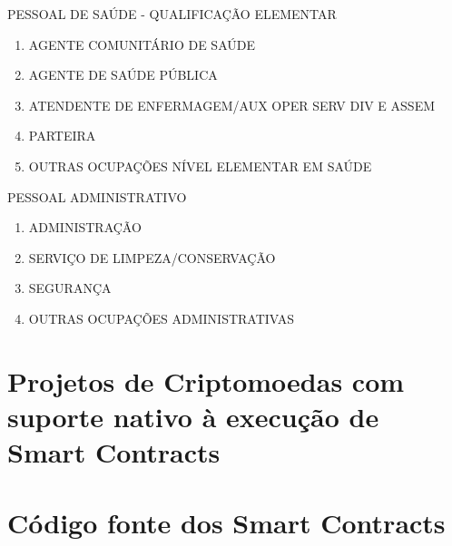 \documentclass[a4paper,11pt]{article}
\begin{document}
PESSOAL DE SAÚDE - QUALIFICAÇÃO ELEMENTAR
\begin{enumerate}
    \item AGENTE COMUNITÁRIO DE SAÚDE
    \item AGENTE DE SAÚDE PÚBLICA
    \item ATENDENTE DE ENFERMAGEM/AUX OPER SERV DIV E ASSEM
    \item PARTEIRA
    \item OUTRAS OCUPAÇÕES NÍVEL ELEMENTAR EM SAÚDE
\end{enumerate}
PESSOAL ADMINISTRATIVO
\begin{enumerate}
    \item ADMINISTRAÇÃO
    \item SERVIÇO DE LIMPEZA/CONSERVAÇÃO
    \item SEGURANÇA
    \item OUTRAS OCUPAÇÕES ADMINISTRATIVAS
\end{enumerate}

\newpage
\section{Projetos de Criptomoedas com suporte nativo à execução de Smart Contracts}
\label{app:outrasCriptomoedasSmartContracts}

\newpage
\section{Código fonte dos Smart Contracts}
\label{app:codigoSmartContracts}
\end{document}
